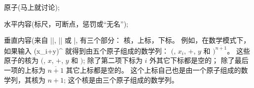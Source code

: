 {{{{{%
\smallskip
\item\bull 原子(马上就讨论);

\item\bull 水平内容(标尺，可断点，惩罚或``无名'');

\item\bull 垂直内容(来自 |\mark|, |\insert| 或 |, 有三个部分：
{核，上标，下标}。%
例如，在数学模式下，如果输入
\begintt
     (x_i+y)^{}
\endtt
就得到由五个原子组成的数学列：
$($, $x_i$, $+$, $y$ 和 $)^{\overline{n+1}}$。%
这些原子的核为 $($, $x$, $+$, $y$ 和 $)$;
除了第二项下标为 $i$ 外其它下标都是空的；
除了最后一项的上标为 $\overline{n+1}$ 其它上标都是空的。%
这个上标自己也是由一个原子组成的数学列，其核为 $n+1$;
这个核是由三个原子组成的数学列。

}}}}}
